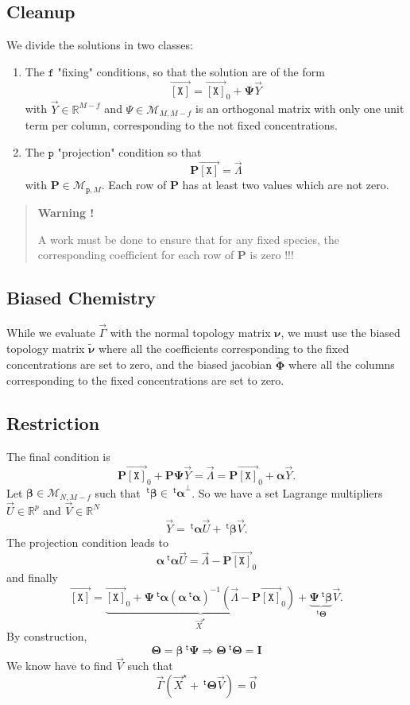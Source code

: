 \documentclass[aps,twocolumn]{revtex4}
\newcommand{\myconc}[1]{\left\lbrack #1 \right\rbrack}
\newcommand{\mychem}[1]{{\mathtt{#1}}}
\newcommand{\mymat}[1]{\boldsymbol{#1}}
\newcommand{\mytrn}[1]{{\!\!~^{\mathsf{t}}{#1}}}
\newcommand{\myvec}[1]{\overrightarrow{#1}}
\newcommand{\vecX}{\myvec{\myconc{\mychem{X}}}}
\newcommand{\fixed}{\mathtt{f}}
\newcommand{\proj}{\mathtt{p}}
\begin{document}
\subsection{Cleanup}
We divide the solutions in two classes:
\begin{enumerate}
	\item The $\fixed$ "fixing" conditions, so that the solution are of the form
	$$
		\vecX = \vecX_0 + \mymat{\Psi} \vec{Y}
	$$
	with $\vec{Y}\in\mathbb{R}^{M-f}$ and $\Psi\in\mathcal{M}_{M,M-f}$ is an orthogonal matrix with only one
	unit term per column, corresponding to the not fixed concentrations.

	\item The $\proj$ "projection" condition so that
	$$
		\mymat{P}\vecX = \myvec{\Lambda}	
	$$
	with $\mymat{P}\in\mathcal{M}_{\proj,M}$.
	 Each row of $\mymat{P}$ has at least two 
	values which are not zero.
\end{enumerate}

\begin{quote}
\centerline{\textbf{Warning !}}
A work must be done to ensure that for any fixed species, the corresponding coefficient for
each row of $\mymat{P}$  is zero !!!
\end{quote}

\subsection{Biased Chemistry}
While we evaluate $\vec{\Gamma}$ with the normal topology matrix $\mymat{\nu}$, we must use
the biased topology matrix $\tilde{\mymat{\nu}}$ where all the coefficients corresponding to the
fixed concentrations are set to zero, and the biased jacobian $\tilde{\mymat{\Phi}}$ where
all the columns corresponding to the fixed concentrations are set to zero.

\subsection{Restriction}
The final condition is
$$
	\mymat{P}\vecX_0 + \mymat{P}\mymat{\Psi} \vec{Y} = \vec{\Lambda} = \mymat{P}\vecX_0 + \mymat{\alpha} \vec{Y}.
$$
Let $\mymat{\beta}\in\mathcal{M}_{N,M-f}$ such that $\mytrn{\mymat{\beta}} \in \mytrn{\mymat{\alpha}}^\perp$.
So we have a set Lagrange multipliers $\vec{U}\in\mathbb{R}^{p}$ and $\vec{V}\in\mathbb{R}^{N}$
$$
	\vec{Y} = \mytrn{\mymat{\alpha}}\vec{U} + \mytrn{\mymat{\beta}}\vec{V}.
$$
The projection condition leads to
$$
	\mymat{\alpha}\mytrn{\mymat{\alpha}}\vec{U} = \vec{\Lambda} - \mymat{P}\vecX_0
$$
and finally
$$
	\vecX = \underbrace{\vecX_0 + \mymat{\Psi} \mytrn{\mymat{\alpha}}\left(\mymat{\alpha}\mytrn{\mymat{\alpha}}\right)^{-1}\left(\vec{\Lambda} - \mymat{P}\vecX_0\right)}_{\vec{X}^\star}
	+\underbrace{\mymat{\Psi}\mytrn{\mymat{\beta}}}_{\mytrn{\mymat{\Theta}}}\vec{V}.
$$
By construction,
$$
	\mymat{\Theta} = \mymat{\beta}\mytrn{\mymat{\Psi}} \Rightarrow \mymat{\Theta}\mytrn{\mymat{\Theta}} = \mymat{I}
$$
We know have to find $\vec{V}$ such that
$$
	\vec{\Gamma}(\vec{X}^\star + \mytrn{\mymat{\Theta}}\vec{V}) = \vec{0}
$$
\end{document}
